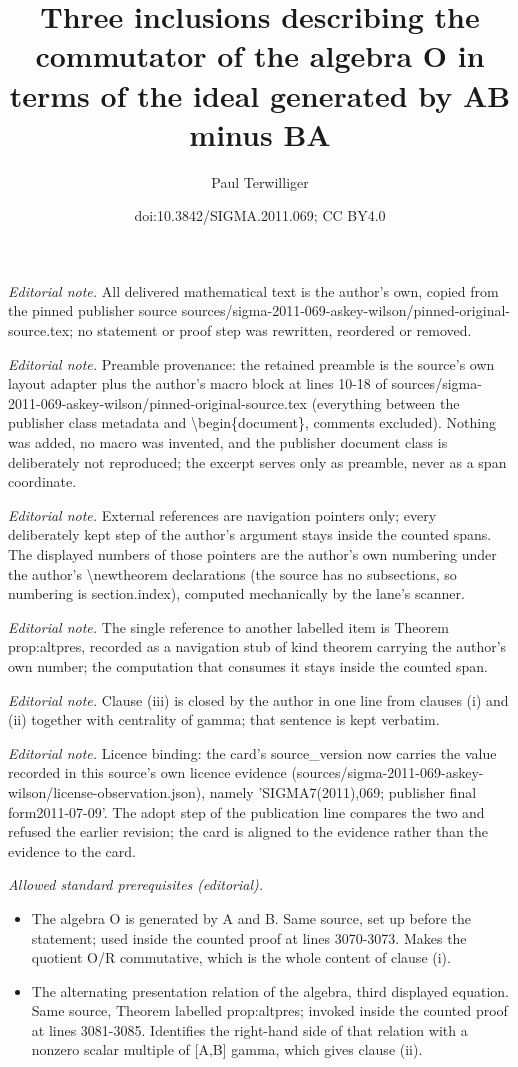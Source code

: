\documentclass[10pt,a4paper]{amsart}
\title{Three inclusions describing the commutator of the algebra O in terms of the ideal generated by AB minus BA}
\author{Paul Terwilliger}
\date{doi:10.3842/SIGMA.2011.069; CC BY4.0}
\begin{document}
\maketitle
\noindent\textit{Editorial note.} All delivered mathematical text is the author's own, copied from the pinned publisher source sources/sigma-2011-069-askey-wilson/pinned-original-source.tex; no statement or proof step was rewritten, reordered or removed.\par\medskip
\noindent\textit{Editorial note.} Preamble provenance: the retained preamble is the source's own layout adapter plus the author's macro block at lines 10-18 of sources/sigma-2011-069-askey-wilson/pinned-original-source.tex (everything between the publisher class metadata and \textbackslash{}begin\{document\}, comments excluded). Nothing was added, no macro was invented, and the publisher document class is deliberately not reproduced; the excerpt serves only as preamble, never as a span coordinate.\par\medskip
\noindent\textit{Editorial note.} External references are navigation pointers only; every deliberately kept step of the author's argument stays inside the counted spans. The displayed numbers of those pointers are the author's own numbering under the author's \textbackslash{}newtheorem declarations (the source has no subsections, so numbering is section.index), computed mechanically by the lane's scanner.\par\medskip
\noindent\textit{Editorial note.} The single reference to another labelled item is Theorem prop:altpres, recorded as a navigation stub of kind theorem carrying the author's own number; the computation that consumes it stays inside the counted span.\par\medskip
\noindent\textit{Editorial note.} Clause (iii) is closed by the author in one line from clauses (i) and (ii) together with centrality of gamma; that sentence is kept verbatim.\par\medskip
\noindent\textit{Editorial note.} Licence binding: the card's source\_version now carries the value recorded in this source's own licence evidence (sources/sigma-2011-069-askey-wilson/license-observation.json), namely 'SIGMA7(2011),069; publisher final form2011-07-09'. The adopt step of the publication line compares the two and refused the earlier revision; the card is aligned to the evidence rather than the evidence to the card.\par\medskip
\noindent\textit{Allowed standard prerequisites (editorial).}\begin{itemize}
\item The algebra O is generated by A and B. Same source, set up before the statement; used inside the counted proof at lines 3070-3073. Makes the quotient O/R commutative, which is the whole content of clause (i).
\item The alternating presentation relation of the algebra, third displayed equation. Same source, Theorem labelled prop:altpres; invoked inside the counted proof at lines 3081-3085. Identifies the right-hand side of that relation with a nonzero scalar multiple of [A,B] gamma, which gives clause (ii).
\end{itemize}\medskip
\end{document}
